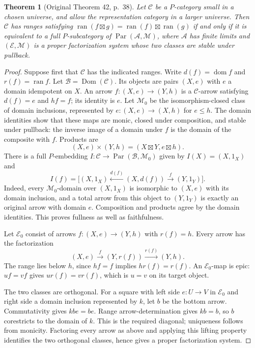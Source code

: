 \documentclass[11pt]{article}
\newtheorem{theorem}{Theorem}[section]
\newcommand{\C}{\mathcal C}\newcommand{\D}{\mathcal D}\newcommand{\B}{\mathcal B}
\newcommand{\dom}{\operatorname{dom}}\newcommand{\ran}{\operatorname{ran}}
\begin{document}
\begin{theorem}[Original Theorem 42, p.~38]\label{thm:range-representation}
Let $\C$ be a $P$-category small in a chosen universe, and allow the representation category in a larger universe. Then $\C$ has ranges satisfying
$\ran(f\boxtimes g)=\ran(f)\boxtimes\ran(g)$
if and only if it is equivalent to a full $P$-subcategory of
$\operatorname{Par}(\mathcal A,\mathcal M)$,
where $\mathcal A$ has finite limits and $(\mathcal E,\mathcal M)$ is a proper factorization system whose two classes are stable under pullback.
\end{theorem}
\begin{proof}
Suppose first that $\C$ has the indicated ranges. Write $d(f)=\dom f$ and $r(f)=\ran f$. Let $\mathcal B=\operatorname{Dom}(\C)$. Its objects are pairs $(X,e)$ with $e$ a domain idempotent on $X$. An arrow
$f:(X,e)\to(Y,h)$ is a $\C$-arrow satisfying $d(f)=e$ and $hf=f$; its identity is $e$. Let $\mathcal M_0$ be the isomorphism-closed class of domain inclusions, represented by
$e:(X,e)\to(X,h)$ for $e\leq h$.
The domain identities show that these maps are monic, closed under composition, and stable under pullback: the inverse image of a domain under $f$ is the domain of the composite with $f$. Products are
\[
(X,e)\times(Y,h)=(X\boxtimes Y,e\boxtimes h).
\]
There is a full $P$-embedding
$I:\C\to\operatorname{Par}(\mathcal B,\mathcal M_0)$
given by $I(X)=(X,1_X)$ and
\[
I(f)=\bigl[(X,1_X)\xleftarrow{d(f)}(X,d(f))\xrightarrow{f}(Y,1_Y)\bigr].
\]
Indeed, every $\mathcal M_0$-domain over $(X,1_X)$ is isomorphic to $(X,e)$ with its domain inclusion, and a total arrow from this object to $(Y,1_Y)$ is exactly an original arrow with domain $e$. Composition and products agree by the domain identities. This proves fullness as well as faithfulness.

Let $\mathcal E_0$ consist of arrows $f:(X,e)\to(Y,h)$ with $r(f)=h$. Every arrow has the factorization
\[
(X,e)\xrightarrow{f}(Y,r(f))\xrightarrow{r(f)}(Y,h).
\]
The range lies below $h$, since $hf=f$ implies $hr(f)=r(f)$. An $\mathcal E_0$-map is epic: $uf=vf$ gives $ur(f)=vr(f)$, which is $u=v$ on its target object.

The two classes are orthogonal. For a square with left side $e:U\to V$ in $\mathcal E_0$ and right side a domain inclusion represented by $k$, let $b$ be the bottom arrow. Commutativity gives $kbe=be$. Range arrow-determination gives $kb=b$, so $b$ corestricts to the domain of $k$. This is the required diagonal; uniqueness follows from monicity. Factoring every arrow as above and applying this lifting property identifies the two orthogonal classes, hence gives a proper factorization system.


\end{proof}
\end{document}
